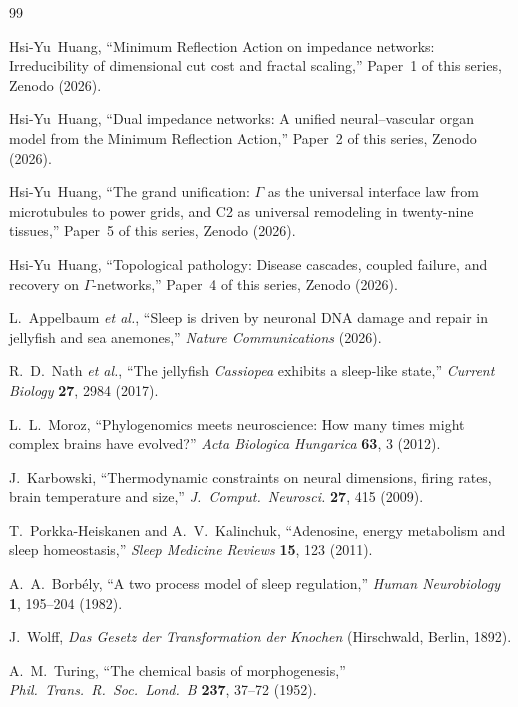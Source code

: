 \documentclass[aps,pre,twocolumn,superscriptaddress,floatfix]{revtex4-2}
\begin{document}
\begin{thebibliography}{99}

Hsi-Yu~Huang,
``Minimum Reflection Action on impedance networks:
Irreducibility of dimensional cut cost and fractal scaling,''
Paper~1 of this series, Zenodo (2026).

Hsi-Yu~Huang,
``Dual impedance networks: A unified neural--vascular organ model
from the Minimum Reflection Action,''
Paper~2 of this series, Zenodo (2026).

Hsi-Yu~Huang,
``The grand unification: $\Gamma$ as the universal interface
law from microtubules to power grids, and C2 as universal
remodeling in twenty-nine tissues,''
Paper~5 of this series, Zenodo (2026).

Hsi-Yu~Huang,
``Topological pathology: Disease cascades, coupled failure,
and recovery on $\Gamma$-networks,''
Paper~4 of this series, Zenodo (2026).

L.~Appelbaum \emph{et al.},
``Sleep is driven by neuronal DNA damage and repair
in jellyfish and sea anemones,''
\emph{Nature Communications} (2026).

R.~D.~Nath \emph{et al.},
``The jellyfish \textit{Cassiopea} exhibits a sleep-like state,''
\emph{Current Biology} \textbf{27}, 2984 (2017).

L.~L.~Moroz,
``Phylogenomics meets neuroscience:
How many times might complex brains have evolved?''
\emph{Acta Biologica Hungarica} \textbf{63}, 3 (2012).

J.~Karbowski,
``Thermodynamic constraints on neural dimensions, firing rates,
brain temperature and size,''
\emph{J.\ Comput.\ Neurosci.} \textbf{27}, 415 (2009).

T.~Porkka-Heiskanen and A.~V.~Kalinchuk,
``Adenosine, energy metabolism and sleep homeostasis,''
\emph{Sleep Medicine Reviews} \textbf{15}, 123 (2011).

A.~A.~Borb\'{e}ly,
``A two process model of sleep regulation,''
\emph{Human Neurobiology} \textbf{1}, 195--204 (1982).

J.~Wolff,
\emph{Das Gesetz der Transformation der Knochen}
(Hirschwald, Berlin, 1892).

A.~M.~Turing,
``The chemical basis of morphogenesis,''
\emph{Phil.\ Trans.\ R.\ Soc.\ Lond.\ B}
\textbf{237}, 37--72 (1952).


\end{thebibliography}
\end{document}
